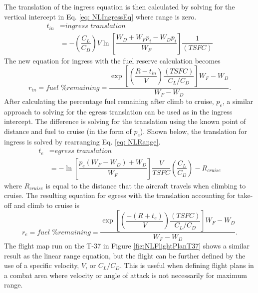 The translation of the ingress equation is then calculated by solving for the vertical intercept in Eq. \ref{eq: NLIngressEq} where range is zero.
\begin{align*}
    t_{in}&= \textit{ingress translation} \\ &=-\left(\dfrac{C_L}{C_D}\right)V\ln\left[\dfrac{W_D+W_Fp_i- W_Dp_i}{W_F}\right]\dfrac{1}{(TSFC)}
\end{align*}
The new equation for ingress with the fuel reserve calculation becomes
\begin{equation}
    r_{in} = \textit{fuel \% remaining} =\dfrac{\exp\left[\left(\dfrac{R-t_{in}}{V}\right)\dfrac{(TSFC)}{C_L/C_D}\right]W_F-W_D}{W_F - W_D}.
    \label{eq: NLIngressFull}
\end{equation}
After calculating the percentage fuel remaining after climb to cruise, $p_e$, a similar approach to solving for the egress translation can be used as in the ingress intercept. The difference is solving for the translation using the known point of distance and fuel to cruise (in the form of $p_e$). Shown below, the translation for ingress is solved by rearranging Eq. \ref{eq: NLRange}. 
\begin{align*}
    t_e &= \textit{egress translation}\\
    &=-\ln\left[\dfrac{p_e(W_F-W_D)+W_D}{W_F}\right]\dfrac{V}{TSFC}\left(\dfrac{C_L}{C_D}\right)-R_{cruise}
\end{align*}
where $R_{cruise}$ is equal to the distance that the aircraft travels when climbing to cruise. The resulting equation for egress with the translation accounting for take-off and climb to cruise is 
\begin{equation}
    r_e = \textit{fuel \% remaining} = \dfrac{\exp\left[\left(\dfrac{-(R+t_e)}{V}\right)\dfrac{(TSFC)}{C_L/C_D}\right]W_F-W_D}{W_F - W_D}.
    \label{eq: NLEgressEqFull}
\end{equation}
The flight map run on the T-37 in Figure \ref{fig:NLFlightPlanT37} shows a similar result as the linear range equation, but the flight can be further defined by the use of a specific velocity, $V$, or $C_L/C_D$. This is useful when defining flight plans in a combat area where velocity or angle of attack is not necessarily for maximum range.
